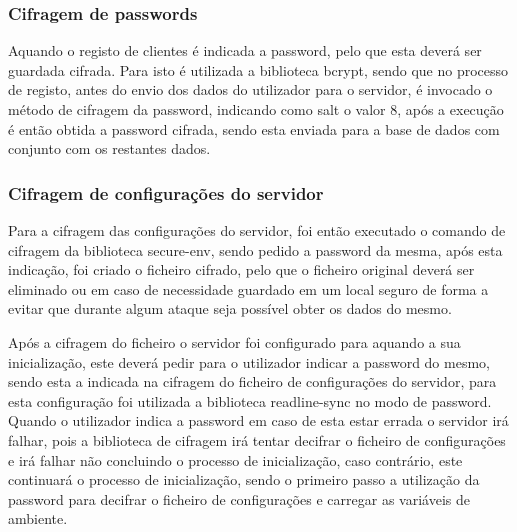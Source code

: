 \subsubsection{Cifragem de passwords}
Aquando o registo de clientes é indicada a password, pelo que esta deverá ser guardada cifrada. Para isto é utilizada a biblioteca bcrypt, sendo que no processo de registo, antes do envio dos dados do utilizador para o servidor, é invocado o método de cifragem da password, indicando como salt o valor 8, após a execução é então obtida a password cifrada, sendo esta enviada para a base de dados com conjunto com os restantes dados.

\subsubsection{Cifragem de configurações do servidor}
Para a cifragem das configurações do servidor, foi então executado o comando de cifragem da biblioteca secure-env, sendo pedido a password da mesma, após esta indicação, foi criado o ficheiro cifrado, pelo que o ficheiro original deverá ser eliminado ou em caso de necessidade guardado em um local seguro de forma a evitar que durante algum ataque seja possível obter os dados do mesmo.

Após a cifragem do ficheiro o servidor foi configurado para aquando a sua inicialização, este deverá pedir para o utilizador indicar a password do mesmo, sendo esta a indicada na cifragem do ficheiro de configurações do servidor, para esta configuração foi utilizada a biblioteca readline-sync no modo de password. Quando o utilizador indica a password em caso de esta estar errada o servidor irá falhar, pois a biblioteca de cifragem irá tentar decifrar o ficheiro de configurações e irá falhar não concluindo o processo de inicialização, caso contrário, este continuará o processo de inicialização, sendo o primeiro passo a utilização da password para decifrar o ficheiro de configurações e carregar as variáveis de ambiente.